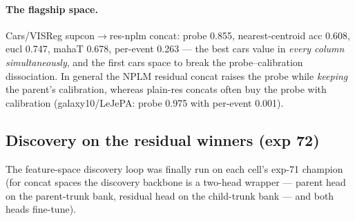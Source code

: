 \documentclass[11pt]{article}
\begin{document}
\paragraph{The flagship space.}
Cars/VISReg supcon$\to$res-nplm concat: probe 0.855, nearest-centroid acc
0.608, eucl 0.747, mahaT 0.678, per-event 0.263 --- the best cars value
in \emph{every column simultaneously}, and the first cars space to break
the probe--calibration dissociation.  In general the NPLM residual
concat raises the probe while \emph{keeping} the parent's calibration,
whereas plain-res concats often buy the probe with calibration
(galaxy10/LeJePA: probe 0.975 with per-event 0.001).

\subsection{Discovery on the residual winners (exp 72)}

The feature-space discovery loop was finally run on each cell's exp-71
champion (for concat spaces the discovery backbone is a two-head wrapper
--- parent head on the parent-trunk bank, residual head on the
child-trunk bank --- and both heads fine-tune).
\end{document}
